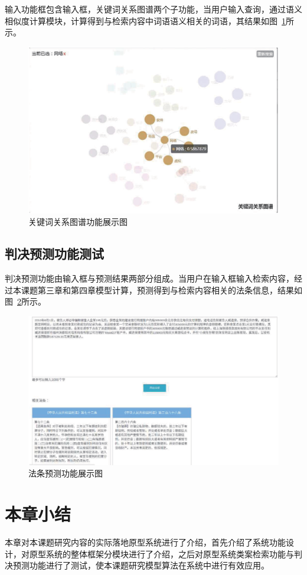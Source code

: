 输入功能框包含输入框，关键词关系图谱两个子功能，当用户输入查询，通过语义相似度计算模块，计算得到与检索内容中词语语义相关的词语，其结果如图~\ref{fig:sys_word}所示。
\begin{figure}[htbp]%
    \centering
    \includegraphics[scale=0.35, clip=true]{./sources/sys_word.eps}
    \caption{\label{fig:sys_word}关键词关系图谱功能展示图}
\end{figure}

\subsection{判决预测功能测试}
判决预测功能由输入框与预测结果两部分组成。当用户在输入框输入检索内容，经过本课题第三章和第四章模型计算，预测得到与检索内容相关的法条信息，结果如图~\ref{fig:sys_article}所示。
\begin{figure}[htbp]%
    \centering
    \includegraphics[scale=0.35, clip=true]{./sources/sys_article.eps}
    \caption{\label{fig:sys_article}法条预测功能展示图}
\end{figure}

\section{本章小结}
本章对本课题研究内容的实际落地原型系统进行了介绍，首先介绍了系统功能设计，对原型系统的整体框架分模块进行了介绍，之后对原型系统类案检索功能与判决预测功能进行了测试，使本课题研究模型算法在系统中进行有效应用。